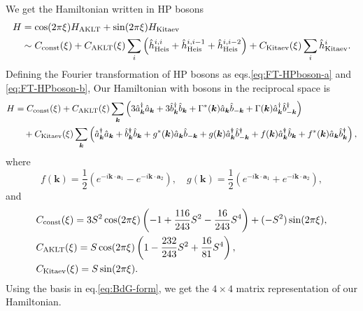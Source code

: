 \documentclass[11pt, aps, longbibliography]{article}
\begin{document}
We get the Hamiltonian written in HP bosons
\begin{align}
    H &= \cos(2\pi \xi)H_{\rm AKLT} + \sin(2\pi \xi)H_{\rm Kitaev} \notag \\
    &\sim C_{\rm const}(\xi) + C_{\rm AKLT}(\xi)\sum_{i}\left( \hat{h}_{\rm Heis}^{i,i} + \hat{h}_{\rm Heis}^{i,i-1} + \hat{h}_{\rm Heis}^{i,i-2} \right) + C_{\rm Kitaev}(\xi) \sum_{i} \hat{h}_{\rm Kitaev}^i.
\end{align}
Defining the Fourier transformation of HP bosons as eqs.\eqref{eq:FT-HPboson-a} and \eqref{eq:FT-HPboson-b},
Our Hamiltonian with bosons in the reciprocal space is
\begin{align}
    H &= C_{\rm const}(\xi) + C_{\rm AKLT}(\xi)\sum_{\bm{k}} \left(3\hat{a}^\dagger_{\bm{k}}\hat{a}_{\bm{k}} + 3\hat{b}^\dagger_{\bm{k}}\hat{b}_{\bm{k}} + \Gamma^*(\bm{k}) \hat{a}_{\bm{k}}\hat{b}_{-\bm{k}} + \Gamma(\bm{k}) \hat{a}_{\bm{k}}^\dagger\hat{b}_{-\bm{k}}^\dagger\right) \notag \\
    &\quad + C_{\rm Kitaev}(\xi)\sum_{\bm{k}} \left( \hat{a}^\dagger_{\bm{k}}\hat{a}_{\bm{k}} + \hat{b}^\dagger_{\bm{k}}\hat{b}_{\bm{k}} + g^*(\bm{k}) \hat{a}_{\bm{k}}\hat{b}_{-\bm{k}} + g(\bm{k}) \hat{a}_{\bm{k}}^\dagger \hat{b}_{-\bm{k}}^\dagger + f(\bm{k}) \hat{a}_{\bm{k}}^\dagger\hat{b}_{\bm{k}} + f^*(\bm{k}) \hat{a}_{\bm{k}}\hat{b}_{\bm{k}}^\dagger \right),
\end{align}
where
\begin{equation}
    f(\bm{k}) = \frac{1}{2}\left( e^{-i\bm{k}\cdot\bm{a}_1} - e^{-i\bm{k}\cdot\bm{a}_2} \right), \quad g(\bm{k}) = \frac{1}{2}\left( e^{-i\bm{k}\cdot\bm{a}_1} + e^{-i\bm{k}\cdot\bm{a}_2} \right),
\end{equation}
and
\begin{align}
    &C_{\rm const}(\xi) = 3S^2\cos(2\pi\xi)\left(-1+\frac{116}{243}S^2-\frac{16}{243}S^4\right) + (-S^2)\sin(2\pi\xi), \\
    &C_{\rm AKLT}(\xi) = S\cos(2\pi\xi)\left(1-\frac{232}{243}S^2+\frac{16}{81}S^4\right), \\
    &C_{\rm Kitaev}(\xi) = S\sin(2\pi\xi).
\end{align}
Using the basis in eq.\eqref{eq:BdG-form}, we get the $4\times4$ matrix representation of our Hamiltonian.
\end{document}
